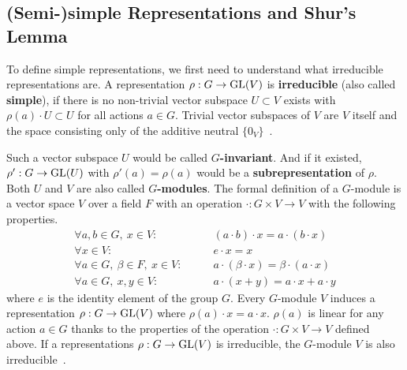 \subsection{(Semi-)simple Representations and Shur's Lemma}
\label{sec:reprep.simp}

To define simple representations, we first need to understand what irreducible representations are.
A representation $\rho: G \to \operatorname{GL}(V)$ is \textbf{irreducible} (also called \textbf{simple}), if there is no non-trivial vector subspace $U \subset V$ exists with $\rho(a) \cdot U \subset U$ for all actions $a \in G$.
Trivial vector subspaces of $V$ are $V$ itself and the space consisting only of the additive neutral $\{0_V\}$~\cite{hein2013}.

Such a vector subspace $U$ would be called \textbf{$G$-invariant}.
And if it existed, $\rho': G \to \operatorname{GL}(U)$ with $\rho'(a) = \rho(a)$ would be a \textbf{subrepresentation} of $\rho$.
Both $U$ and $V$ are also called \textbf{$G$-modules}.
The formal definition of a $G$-module is a vector space $V$ over a field $F$ with an operation $\cdot: G \times V \to V$ with the following properties.
\begin{subequations}
    \begin{align}
        \forall a, b \in G,\ x \in V: \qquad & (a \cdot b) \cdot x = a \cdot (b \cdot x) \\
        \forall x \in V: \qquad & e \cdot x = x \\
        \forall a \in G,\ \beta \in F,\ x \in V: \qquad & a \cdot (\beta \cdot x) = \beta \cdot (a \cdot x) \\
        \forall a \in G,\ x, y \in V: \qquad & a \cdot (x + y) = a \cdot x + a \cdot y
    \end{align}
\end{subequations}
where $e$ is the identity element of the group $G$.
Every $G$-module $V$ induces a representation $\rho: G \to \operatorname{GL}(V)$ where $\rho(a) \cdot x = a \cdot x$.
$\rho(a)$ is linear for any action $a \in G$ thanks to the properties of the operation $\cdot: G \times V \to V$ defined above.
If a representations $\rho: G \to \operatorname{GL}(V)$ is irreducible, the $G$-module $V$ is also irreducible~\cite{hein2013}.


